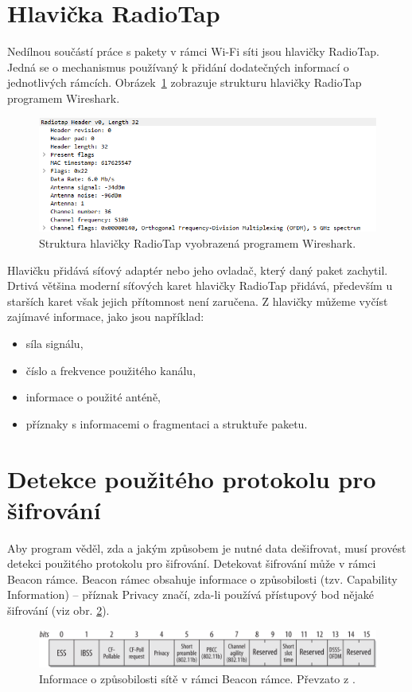 \section{Hlavička RadioTap}
Nedílnou součástí práce s pakety v rámci Wi-Fi síti jsou hlavičky RadioTap. Jedná se o mechanismus používaný k přidání dodatečných informací o jednotlivých rámcích. Obrázek~\ref{img:radiotap} zobrazuje strukturu hlavičky RadioTap programem Wireshark.
\begin{figure}[htbp]
  \centering
  \includegraphics[width=14cm]{obrazky-figures/radiotap.png}
  \caption{Struktura hlavičky RadioTap vyobrazená programem Wireshark.}
  \label{img:radiotap}
\end{figure}

Hlavičku přidává síťový adaptér nebo jeho ovladač, který daný paket zachytil. Drtivá většina moderní síťových karet hlavičky RadioTap přidává, především u starších karet však jejich přítomnost není zaručena. Z hlavičky můžeme vyčíst zajímavé informace, jako jsou například:
\begin{itemize}
  \item{síla signálu,}
  \item{číslo a frekvence použitého kanálu,}
  \item{informace o použité anténě,}
  \item{příznaky s informacemi o fragmentaci a struktuře paketu.}
\end{itemize}

\section{Detekce použitého protokolu pro šifrování}
Aby program věděl, zda a jakým způsobem je nutné data dešifrovat, musí provést detekci použitého protokolu pro šifrování. Detekovat šifrování může v rámci Beacon rámce. Beacon rámec obsahuje informace o způsobilosti (tzv. Capability Information) -- příznak Privacy značí, zda-li používá přístupový bod nějaké šifrování (viz obr. \ref{img:Beacon-capability}). 
\begin{figure}[htbp]
  \centering
  \includegraphics[width=14cm]{obrazky-figures/Beacon-capability.png}
  \caption{Informace o způsobilosti sítě v rámci Beacon rámce. Převzato z \cite{gast2017802}.}
  \label{img:Beacon-capability}
\end{figure}

